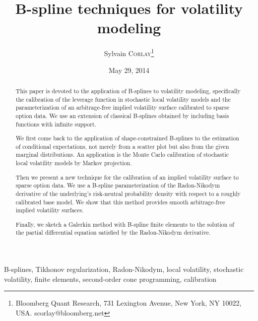 \documentclass[a4paper]{article}
\author{Sylvain \textsc{Corlay}\footnote{Bloomberg Quant Research, 731 Lexington Avenue, New York, NY 10022, USA. scorlay@bloomberg.net}}
\title{B-spline techniques for volatility modeling}
\date{May 29, 2014}
\newcommand{\1}{\textbf{1}}
\def\keywordname{{\bf Keywords:}}
\newcommand{\keywords}[1]{\par\addvspace\baselineskip\noindent\keywordname\enspace\ignorespaces#1}
\begin{document}
\maketitle
\begin{abstract}
\par This paper is devoted to the application of B-splines to volatility modeling, specifically the calibration of the leverage function in stochastic local volatility models and the parameterization of an arbitrage-free implied volatility surface calibrated to sparse option data. We use an extension of classical B-splines obtained by including basis functions with infinite support. 
\par We first come back to the application of shape-constrained B-splines to the estimation of conditional expectations, not merely from a scatter plot but also from the given marginal distributions. An application is the Monte Carlo calibration of stochastic local volatility models by Markov projection. 
\par Then we present a new technique for the calibration of an implied volatility surface to sparse option data. We use a B-spline parameterization of the Radon-Nikodym derivative of the underlying's risk-neutral probability density with respect to a roughly calibrated base model. We show that this method provides smooth arbitrage-free implied volatility surfaces. 
\par Finally, we sketch a Galerkin method with B-spline finite elements to the solution of the partial differential equation satisfied by the Radon-Nikodym derivative.
\end{abstract}
\keywords{B-splines, Tikhonov regularization, Radon-Nikodym, local volatility, stochastic volatility, finite elements, second-order cone programming, calibration}
\vspace{2mm}
\end{document}
